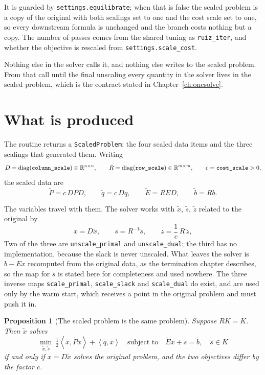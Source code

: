 \documentclass[a4paper,11pt]{book}
\theoremstyle{plain}
\newtheorem{proposition}[theorem]{Proposition}
\theoremstyle{definition}
\theoremstyle{remark}
\numberwithin{equation}{chapter}
\numberwithin{algorithm}{chapter}
\newcommand{\R}{\mathbb{R}}
\newcommand{\inner}[2]{\left\langle #1, #2 \right\rangle}
\newcommand{\diag}{\operatorname{diag}}
\begin{document}
	It is guarded by \texttt{settings.equilibrate}; when that is false the
	scaled problem is a copy of the original with both scalings set to one and
	the cost scale set to one, so every downstream formula is unchanged and the
	branch costs nothing but a copy. The number of passes comes from the shared
	tuning as \texttt{ruiz\_iter}, and whether the objective is rescaled from
	\texttt{settings.scale\_cost}.

	Nothing else in the solver calls it, and nothing else writes to the scaled
	problem. From that call until the final unscaling every quantity in the
	solver lives in the scaled problem, which is the contract stated in
	Chapter~\ref{ch:onesolve}.

	\section{What is produced}

	The routine returns a \texttt{ScaledProblem}: the four scaled data items and
	the three scalings that generated them. Writing
	\[
	D=\diag(\text{\texttt{column\_scale}})\in\R^{n\times n},
	\qquad
	R=\diag(\text{\texttt{row\_scale}})\in\R^{m\times m},
	\qquad
	c=\text{\texttt{cost\_scale}}>0 ,
	\]
	the scaled data are
	\[
	\widetilde P=c\,DPD,
	\qquad
	\widetilde q=c\,Dq,
	\qquad
	\widetilde E=RED,
	\qquad
	\widetilde b=Rb .
	\]

	The variables travel with them. The solver works with $\widetilde x$,
	$\widetilde s$, $\widetilde z$ related to the original by
	\[
	x=D\widetilde x,
	\qquad
	s=R^{-1}\widetilde s,
	\qquad
	z=\frac1c\,R\,\widetilde z ,
	\]
	Two of the three are \texttt{unscale\_primal} and \texttt{unscale\_dual}; the
	third has no implementation, because the slack is never unscaled. What leaves
	the solver is $b-Ex$ recomputed from the original data, as the termination
	chapter describes, so the map for $s$ is stated here for completeness and used
	nowhere. The three inverse maps \texttt{scale\_primal}, \texttt{scale\_slack}
	and \texttt{scale\_dual} do exist, and are used only by the warm start, which
	receives a point in the original problem and must push it in.

	\begin{proposition}[The scaled problem is the same problem]
		\label{prop:ruizsame}
		Suppose $RK=K$. Then $\widetilde x$ solves
		\begin{equation}
			\min_{\widetilde x,\widetilde s}\
			\tfrac12\inner{\widetilde x}{\widetilde P\widetilde x}
			+\inner{\widetilde q}{\widetilde x}
			\quad\text{subject to}\quad
			\widetilde E\widetilde x+\widetilde s=\widetilde b,
			\quad \widetilde s\in K
		\end{equation}
		if and only if $x=D\widetilde x$ solves the original problem, and the two
		objectives differ by the factor $c$.
	\end{proposition}
\end{document}
